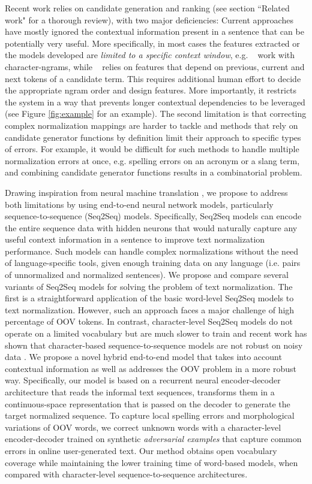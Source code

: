 \documentclass[letterpaper]{article} \usepackage{aaai19}  \usepackage{times}  \usepackage{helvet} \usepackage{courier}  \usepackage[hyphens]{url}  \usepackage{graphicx} \urlstyle{rm} \def\UrlFont{\rm}  \usepackage{graphicx}  \frenchspacing  \setlength{\pdfpagewidth}{8.5in}  \setlength{\pdfpageheight}{11in}
\newcommand{\citet}[1]{\citeauthor{#1}~\shortcite{#1}}
\newcommand{\citep}{\cite}
\begin{document}
Recent work relies on candidate generation and ranking (see section ``Related work" for a thorough review), with two major deficiencies: Current approaches have mostly ignored the contextual information present in a sentence that can be potentially very useful. More specifically, in most cases the features extracted or the models developed are \textit{limited to a specific context window}, e.g. \citet{min2015ncsu_sas_wookhee} work with character-ngrams, while \citet{jin2015ncsu} relies on features that depend on previous, current and next tokens of a candidate term. This requires additional human effort to decide the appropriate ngram order and design features. More importantly, it restricts the system in a way that prevents longer contextual dependencies to be leveraged (see Figure \ref{fig:example} for an example).  The second limitation is that correcting complex normalization mappings are harder to tackle and methods that rely on candidate generator functions by definition limit their approach to specific types of errors. For example, it would be difficult for such methods to handle multiple normalization errors at once, e.g. spelling errors on an acronym or a slang term, and combining candidate generator functions results in a combinatorial problem. 

Drawing inspiration from neural machine translation \citep{bahdanau2014neural,luong2015effective}, 
we propose to address both limitations by using end-to-end neural network models, particularly sequence-to-sequence (Seq2Seq) models. Specifically, Seq2Seq models can encode the entire sequence data with hidden neurons that would naturally capture any useful context information in a sentence to improve text normalization performance. Such models can handle complex normalizations without the need of language-specific tools, given enough  training data on any language (i.e. pairs of unnormalized and normalized sentences). 
We propose and compare several variants of Seq2Seq models for solving the problem of text normalization. 
The first is a straightforward application of the basic word-level Seq2Seq models to text normalization. 
However, such an approach faces a major challenge of high percentage of OOV tokens. 
In contrast, character-level Seq2Seq models do not operate on a limited vocabulary but are much slower to train and recent work has shown that character-based sequence-to-sequence models are not robust on noisy data \citep{belinkov2017synthetic}. We propose a novel hybrid end-to-end model that takes into account contextual information as well as addresses the OOV problem in a more robust way. Specifically, our model is based on a recurrent neural encoder-decoder architecture that reads the informal text sequences, transforms them in a continuous-space representation that is passed on the decoder to generate the target normalized sequence. To capture local spelling errors and morphological variations of OOV words, we correct unknown words with a character-level encoder-decoder trained on synthetic \textit{adversarial examples} that capture common errors in online user-generated text. Our method obtains open vocabulary coverage while maintaining the lower training time of word-based models, when compared with character-level sequence-to-sequence architectures. 
\end{document}
